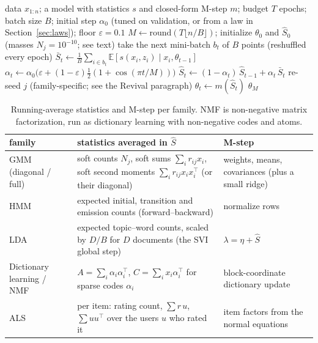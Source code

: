 \documentclass[10pt]{article}
\begin{document}
\begin{algorithm}[tbp]
\caption{Our method: stochastic-approximation EM with a budget-annealed step and revival.}\label{alg:method}
\begin{algorithmic}[1]
\Require data $x_{1:n}$; a model with statistics $s$ and closed-form M-step $m$; budget $T$ epochs; batch size $B$;
initial step $\alpha_0$ (tuned on validation, or from a law in Section~\ref{sec:laws}); floor $\varepsilon = 0.1$
\State $M \gets \mathrm{round}(T \lfloor n/B \rfloor)$; initialize $\theta_0$ and $\hat S_0$ (masses $N_j =
10^{-10}$; see text)
  \State take the next mini-batch $b_t$ of $B$ points (reshuffled every epoch)
  \State $\bar S_t \gets \frac{1}{B}\sum_{i \in b_t} \mathbb{E}[s(x_i, z_i) \mid x_i, \theta_{t-1}]$
  \State $\alpha_t \gets \alpha_0 \big(\varepsilon + (1 - \varepsilon)\tfrac12(1 + \cos(\pi t / M))\big)$
  \State $\hat S_t \gets (1 - \alpha_t)\,\hat S_{t-1} + \alpha_t\, \bar S_t$ 
   
      \State re-seed $j$ (family-specific; see the Revival paragraph)
    \EndFor
  \EndIf
  \State $\theta_t \gets m(\hat S_t)$ 
\EndFor
\State \Return $\theta_M$
\end{algorithmic}
\end{algorithm}

\begin{table}[!htbp]
\centering\small
\caption{Running-average statistics and M-step per family. NMF is non-negative matrix factorization, run as dictionary
learning with non-negative codes and atoms.}\label{tab:stats}
\begin{tabular}{p{2.6cm}p{6.6cm}p{4.6cm}}
\toprule
family & statistics averaged in $\hat S$ & M-step \\
\midrule
GMM (diagonal / full) & soft counts $N_j$, soft sums $\sum_i r_{ij} x_i$, soft second moments $\sum_i r_{ij} x_i
x_i^\top$ (or their diagonal) & weights, means, covariances (plus a small ridge) \\
HMM & expected initial, transition and emission counts (forward--backward) & normalize rows \\
LDA & expected topic--word counts, scaled by $D/B$ for $D$ documents (the SVI global step) & $\lambda = \eta + \hat
S$ \\
Dictionary learning / NMF & $A = \sum_i \alpha_i\alpha_i^\top$, $C = \sum_i x_i \alpha_i^\top$ for sparse codes
$\alpha_i$ & block-coordinate dictionary update \\
ALS & per item: rating count, $\sum r\,u$, $\sum u u^\top$ over the users $u$ who rated it & item factors from the
normal equations \\
\bottomrule
\end{tabular}
\end{table}
\end{document}
